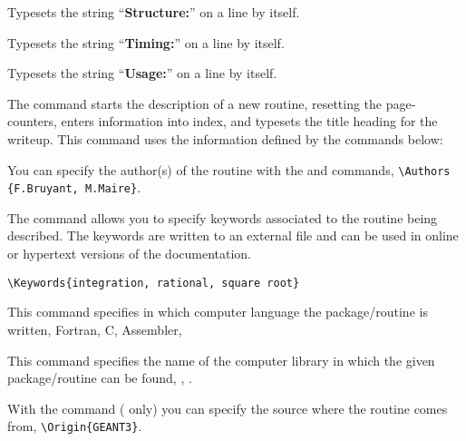 \newpage


Typesets the string ``\textbf{Structure:}'' on a line by itself.


Typesets the string ``\textbf{Timing:}'' on a line by itself.


Typesets the string ``\textbf{Usage:}'' on a line by itself.


The  command starts the description of a new routine,
resetting the page-counters, enters information into index, and
typesets the title heading for the writeup.
This command uses the information defined by the commands below:


\medskip

You can specify the author(s) of
the routine with the  and  commands, \eg
\verb!\Authors {F.Bruyant, M.Maire}!.


The  command allows you to specify keywords
associated to the routine being described.
The keywords are written to an external file and can be used in online
or hypertext versions of the documentation. \eg

\begin{verbatim}
\Keywords{integration, rational, square root}
\end{verbatim}
 

This command specifies in which computer language the package/routine
is written, \eg Fortran, C, Assembler, \etc 


This command specifies the name of the computer library 
in which the given package/routine can be found, \eg
{}, .


With the  command (\GEANT{} only) you can specify the
source where the routine comes from, \eg \verb!\Origin{GEANT3}!.

